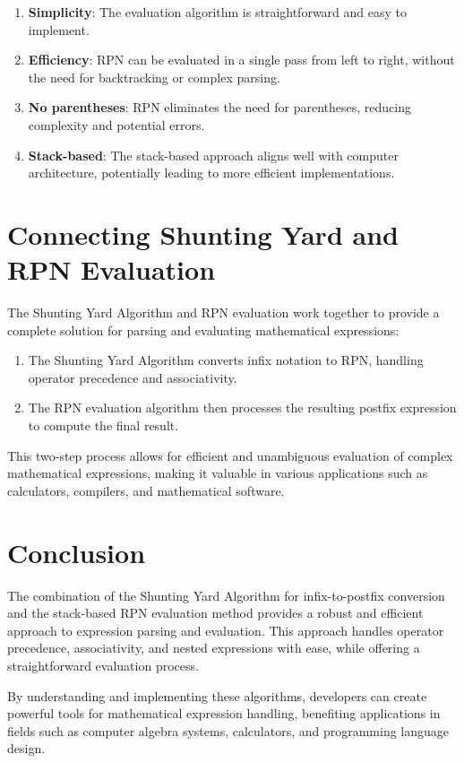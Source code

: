 \documentclass[a4paper,12pt]{article}
\begin{document}
\begin{enumerate}
\item \textbf{Simplicity}: The evaluation algorithm is straightforward and easy to implement.
\item \textbf{Efficiency}: RPN can be evaluated in a single pass from left to right, without the need for backtracking or complex parsing.
\item \textbf{No parentheses}: RPN eliminates the need for parentheses, reducing complexity and potential errors.
\item \textbf{Stack-based}: The stack-based approach aligns well with computer architecture, potentially leading to more efficient implementations.
\end{enumerate}

\section{Connecting Shunting Yard and RPN Evaluation}

The Shunting Yard Algorithm and RPN evaluation work together to provide a complete solution for parsing and evaluating mathematical expressions:

\begin{enumerate}
\item The Shunting Yard Algorithm converts infix notation to RPN, handling operator precedence and associativity.
\item The RPN evaluation algorithm then processes the resulting postfix expression to compute the final result.
\end{enumerate}

This two-step process allows for efficient and unambiguous evaluation of complex mathematical expressions, making it valuable in various applications such as calculators, compilers, and mathematical software.

\section{Conclusion}

The combination of the Shunting Yard Algorithm for infix-to-postfix conversion and the stack-based RPN evaluation method provides a robust and efficient approach to expression parsing and evaluation. This approach handles operator precedence, associativity, and nested expressions with ease, while offering a straightforward evaluation process.

By understanding and implementing these algorithms, developers can create powerful tools for mathematical expression handling, benefiting applications in fields such as computer algebra systems, calculators, and programming language design.

 
\end{document}

